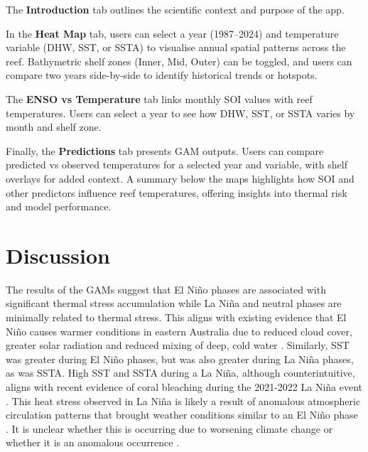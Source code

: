 \documentclass[letterpaper,9pt,twocolumn,twoside,]{pinp}
\begin{document}
The \textbf{Introduction} tab outlines the scientific context and
purpose of the app.

In the \textbf{Heat Map} tab, users can select a year (1987--2024) and
temperature variable (DHW, SST, or SSTA) to visualise annual spatial
patterns across the reef. Bathymetric shelf zones (Inner, Mid, Outer)
can be toggled, and users can compare two years side-by-side to identify
historical trends or hotspots.

The \textbf{ENSO vs Temperature} tab links monthly SOI values with reef
temperatures. Users can select a year to see how DHW, SST, or SSTA
varies by month and shelf zone.

Finally, the \textbf{Predictions} tab presents GAM outputs. Users can
compare predicted vs observed temperatures for a selected year and
variable, with shelf overlays for added context. A summary below the
maps highlights how SOI and other predictors influence reef
temperatures, offering insights into thermal risk and model performance.

\section{Discussion}\label{discussion}

The results of the GAMs suggest that El Niño phases are associated with
significant thermal stress accumulation while La Niña and neutral phases
are minimally related to thermal stress. This aligns with existing
evidence that El Niño causes warmer conditions in eastern Australia due
to reduced cloud cover, greater solar radiation and reduced mixing of
deep, cold water \citet{McGowanTheobald2023}. Similarly, SST was greater
during El Niño phases, but was also greater during La Niña phases, as
was SSTA. High SST and SSTA during a La Niña, although counterintuitive,
aligns with recent evidence of coral bleaching during the 2021-2022 La
Niña event \citet{McGowanTheobald2023}. This heat stress observed in La
Niña is likely a result of anomalous atmospheric circulation patterns
that brought weather conditions similar to an El Niño phase
\citet{Gillett2023}. It is unclear whether this is occurring due to
worsening climate change or whether it is an anomalous occurrence
\citet{McGowanTheobald2023}.
\end{document}

